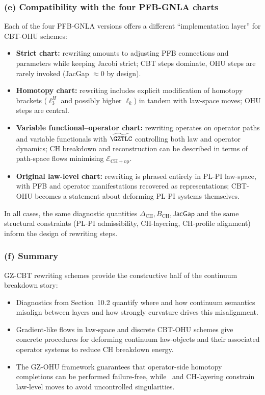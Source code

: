 \documentclass[11pt]{book}
\theoremstyle{plain}
\theoremstyle{definition}
\begin{document}
\subsubsection*{(e) Compatibility with the four PFB-GNLA charts}

Each of the four PFB-GNLA versions offers a different “implementation
layer” for CBT-OHU schemes:

\begin{itemize}
  \item \textbf{Strict chart:}
        rewriting amounts to adjusting PFB connections and parameters
        while keeping Jacobi strict; CBT steps dominate, OHU steps are
        rarely invoked (JacGap $\approx0$ by design).
  \item \textbf{Homotopy chart:}
        rewriting includes explicit modification of homotopy brackets
        ($\ell_3^H$ and possibly higher $\ell_k$) in tandem with
        law-space moves; OHU steps are central.
  \item \textbf{Variable functional--operator chart:}
        rewriting operates on operator paths and variable functionals
        with $\widetilde{\GZTLC}$ controlling both law and operator
        dynamics; CH breakdown and reconstruction can be described in
        terms of path-space flows minimising
        $\mathcal{E}_{\mathrm{CH+op}}$.
  \item \textbf{Original law-level chart:}
        rewriting is phrased entirely in PL-PI law-space, with PFB and
        operator manifestations recovered as representations; CBT-OHU
        becomes a statement about deforming PL-PI systems themselves.
\end{itemize}

In all cases, the same diagnostic quantities
$\Delta_{\mathrm{CH}},B_{\mathrm{CH}},\mathsf{JacGap}$ and the same
structural constraints (PL-PI admissibility, CH-layering, CH-profile
alignment) inform the design of rewriting steps.



\subsubsection*{(f) Summary}

GZ-CBT rewriting schemes provide the constructive half of the
continuum breakdown story:

\begin{itemize}
  \item Diagnostics from Section~10.2 quantify where and how continuum
        semantics misalign between layers and how strongly curvature
        drives this misalignment.
  \item Gradient-like flows in law-space and discrete CBT-OHU schemes
        give concrete procedures for deforming continuum law-objects
        and their associated operator systems to reduce CH breakdown
        energy.
  \item The GZ-OHU framework guarantees that operator-side homotopy
        completions can be performed failure-free, while \GZTLC\ and
        CH-layering constrain law-level moves to avoid uncontrolled
        singularities.
\end{itemize}
\end{document}
